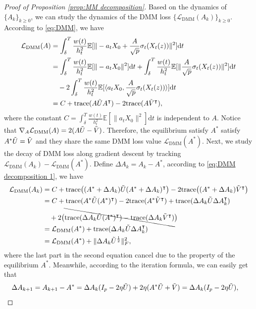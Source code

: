 \documentclass[11pt]{article}
\newcommand{\mb}{\mathbb}
\newcommand{\dee}{\mathrm{d}}
\newcommand{\mc}{\mathcal}
\newcommand{\DMM}{\mc{L}_{\mathrm{DMM}}}
\newcommand{\Tr}{\mathrm{trace}}
\begin{document}
\begin{proof}[Proof of Proposition \ref{prop:MM decomposition}]
 Based on the dynamics of $\{A_k\}_{k\ge 0}$, we can study the dynamics of the DMM loss $\{\DMM(A_k)\}_{k\ge 0}$. According to \eqref{eq:DMM}, we have
\begin{align}
    \DMM(A) & = \int_\delta^T \frac{w(t)}{h_t^2}\mb{E}[  \| -a_t X_0 + \frac{A}{\sqrt{p}}\sigma_t(X_t(z)) \|^2 ] \dee t \nonumber\\
    & = \int_\delta^T \frac{w(t)}{h_t^2}\mb{E}[  \| -a_t X_0  \|^2 ] \dee t + \int_\delta^T \frac{w(t)}{h_t^2}\mb{E}[  \| \frac{A}{\sqrt{p}}\sigma_t(X_t(z)) \|^2 ] \dee t \nonumber \\
    &\quad - {2\int_\delta^T \frac{w(t)}{h_t^2}\mb{E}[  \langle a_t X_0 , \frac{A}{\sqrt{p}}\sigma_t(X_t(z)) \rangle ] \dee t}\nonumber\\
    & =  C + \Tr(A\Tilde{U}A^\intercal) -2\Tr(A\Tilde{V}^\intercal), \label{eq:DMM decomposition 1}
\end{align}
where the constant $C=\int_\delta^T \frac{w(t)}{h_t^2}\mb{E}[  \| a_t X_0  \|^2 ] \dee t$ is independent to $A$. Notice that $\nabla_A \DMM(A) = 2(A\Tilde{U}-\Tilde{V})$. Therefore, the equilibrium satisfy $A^*$ satisfy $A^* \Tilde{U}=\Tilde{V}$ and they share the same DMM loss value $\DMM(A^*)$. Next, we study the decay of DMM loss along gradient descent by tracking $\DMM(A_k)-\DMM(A^*)$. Define $\Delta A_k=A_k-A^*$, according to \eqref{eq:DMM decomposition 1}, we have
\begin{align*}
    \DMM(A_k) & = C + \Tr\big( (A^*+\Delta A_k)\Tilde{U} (A^*+\Delta A_k)^\intercal\big) - 2\Tr\big( (A^*+\Delta A_k)\Tilde{V}^\intercal \big) \\
    & = C + \Tr(A^*\Tilde{U}(A^*)^\intercal) -2 \Tr(A^* \Tilde{V}^\intercal) + \Tr(\Delta A_k\Tilde{U}\Delta A_k^\intercal) \\
    &\quad + 2\big( \bcancel{\Tr(\Delta A_k \Tilde{U} (A^*)^\intercal) -\Tr(\Delta A_k \Tilde{V}^\intercal)} \big) \\
    & = \DMM(A^*) + \Tr(\Delta A_k\Tilde{U}\Delta A_k^\intercal) \\
    & = \DMM(A^*) + \|\Delta A_k\Tilde{U}^{\frac{1}{2}}\|_F^2 ,
\end{align*}
where the last part in the second equation cancel due to the property of the equilibrium $A^*$. Meanwhile, according to the iteration formula, we can easily get that 
\begin{align*}
    \Delta A_{k+1} & = A_{k+1} - {A^*} = \Delta A_k(I_p-2\eta \Tilde{U}) + 2\eta ( {A^*\Tilde{U}} +\Tilde{V} ) = \Delta A_k(I_p-2\eta \Tilde{U}),

\end{align*}
\end{proof}
\end{document}
